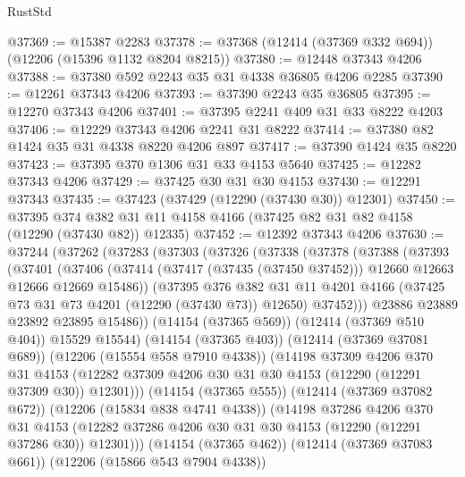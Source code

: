 \begin{lexlean}{RustStd}
\begin{coremodule}
{\begin{coremodule}
{{{{{{{{{{{{{{{{{{{{{{{{{{{{{{{{{{{{{{{{{{{{{{{{{{@37369 := @15387 @2283
@37378 := @37368 (@12414 (@37369 @332 @694)) (@12206 (@15396 @1132 @8204 @8215))
@37380 := @12448 @37343 @4206
@37388 := @37380 @592 @2243 @35 @31 @4338 @36805 @4206 @2285
@37390 := @12261 @37343 @4206
@37393 := @37390 @2243 @35 @36805
@37395 := @12270 @37343 @4206
@37401 := @37395 @2241 @409 @31 @33 @8222 @4203
@37406 := @12229 @37343 @4206 @2241 @31 @8222
@37414 := @37380 @82 @1424 @35 @31 @4338 @8220 @4206 @897
@37417 := @37390 @1424 @35 @8220
@37423 := @37395 @370 @1306 @31 @33 @4153 @5640
@37425 := @12282 @37343 @4206
@37429 := @37425 @30 @31 @30 @4153
@37430 := @12291 @37343
@37435 := @37423 (@37429 (@12290 (@37430 @30)) @12301)
@37450 := @37395
    @374
    @382
    @31
    @11
    @4158
    @4166
    (@37425 @82 @31 @82 @4158 (@12290 (@37430 @82)) @12335)
@37452 := @12392 @37343 @4206
@37630 := @37244
    (@37262
      (@37283
        (@37303
          (@37326
            (@37338
              (@37378
                (@37388
                  (@37393
                    (@37401
                      (@37406
                        (@37414
                          (@37417 (@37435 (@37450 @37452)))
                          @12660
                          @12663
                          @12666
                          @12669
                          @15486))
                      (@37395
                        @376
                        @382
                        @31
                        @11
                        @4201
                        @4166
                        (@37425 @73 @31 @73 @4201 (@12290 (@37430 @73)) @12650)
                        @37452)))
                  @23886
                  @23889
                  @23892
                  @23895
                  @15486))
              (@14154 (@37365 @569))
              (@12414 (@37369 @510 @404))
              @15529
              @15544)
            (@14154 (@37365 @403))
            (@12414 (@37369 @37081 @689))
            (@12206 (@15554 @558 @7910 @4338))
            (@14198
              @37309
              @4206
              @370
              @31
              @4153
              (@12282 @37309 @4206 @30 @31 @30 @4153 (@12290 (@12291 @37309 @30)) @12301)))
          (@14154 (@37365 @555))
          (@12414 (@37369 @37082 @672))
          (@12206 (@15834 @838 @4741 @4338))
          (@14198
            @37286
            @4206
            @370
            @31
            @4153
            (@12282 @37286 @4206 @30 @31 @30 @4153 (@12290 (@12291 @37286 @30)) @12301)))
        (@14154 (@37365 @462))
        (@12414 (@37369 @37083 @661))
        (@12206 (@15866 @543 @7904 @4338))
}}}}}}}}}}}}}}}}}}}}}}}}}}}}}}}}}}}}}}}}}}}}}}}}}}
\end{coremodule}}
\end{coremodule}
\end{lexlean}
